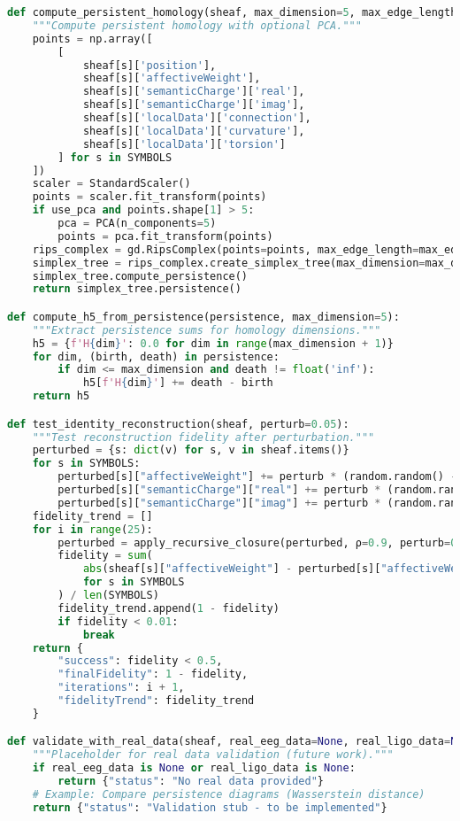 \documentclass[11pt]{article}
\begin{document}
\begin{lstlisting}[language=Python, basicstyle=\small\ttfamily, breaklines=true]
def compute_persistent_homology(sheaf, max_dimension=5, max_edge_length=2.0, use_pca=False):
    """Compute persistent homology with optional PCA."""
    points = np.array([
        [
            sheaf[s]['position'],
            sheaf[s]['affectiveWeight'],
            sheaf[s]['semanticCharge']['real'],
            sheaf[s]['semanticCharge']['imag'],
            sheaf[s]['localData']['connection'],
            sheaf[s]['localData']['curvature'],
            sheaf[s]['localData']['torsion']
        ] for s in SYMBOLS
    ])
    scaler = StandardScaler()
    points = scaler.fit_transform(points)
    if use_pca and points.shape[1] > 5:
        pca = PCA(n_components=5)
        points = pca.fit_transform(points)
    rips_complex = gd.RipsComplex(points=points, max_edge_length=max_edge_length)
    simplex_tree = rips_complex.create_simplex_tree(max_dimension=max_dimension + 1)
    simplex_tree.compute_persistence()
    return simplex_tree.persistence()

def compute_h5_from_persistence(persistence, max_dimension=5):
    """Extract persistence sums for homology dimensions."""
    h5 = {f'H{dim}': 0.0 for dim in range(max_dimension + 1)}
    for dim, (birth, death) in persistence:
        if dim <= max_dimension and death != float('inf'):
            h5[f'H{dim}'] += death - birth
    return h5

def test_identity_reconstruction(sheaf, perturb=0.05):
    """Test reconstruction fidelity after perturbation."""
    perturbed = {s: dict(v) for s, v in sheaf.items()}
    for s in SYMBOLS:
        perturbed[s]["affectiveWeight"] += perturb * (random.random() - 0.5)
        perturbed[s]["semanticCharge"]["real"] += perturb * (random.random() - 0.5)
        perturbed[s]["semanticCharge"]["imag"] += perturb * (random.random() - 0.5)
    fidelity_trend = []
    for i in range(25):
        perturbed = apply_recursive_closure(perturbed, ρ=0.9, perturb=0.025)
        fidelity = sum(
            abs(sheaf[s]["affectiveWeight"] - perturbed[s]["affectiveWeight"])
            for s in SYMBOLS
        ) / len(SYMBOLS)
        fidelity_trend.append(1 - fidelity)
        if fidelity < 0.01:
            break
    return {
        "success": fidelity < 0.5,
        "finalFidelity": 1 - fidelity,
        "iterations": i + 1,
        "fidelityTrend": fidelity_trend
    }

def validate_with_real_data(sheaf, real_eeg_data=None, real_ligo_data=None):
    """Placeholder for real data validation (future work)."""
    if real_eeg_data is None or real_ligo_data is None:
        return {"status": "No real data provided"}
    # Example: Compare persistence diagrams (Wasserstein distance)
    return {"status": "Validation stub - to be implemented"}


\end{lstlisting}
\end{document}

